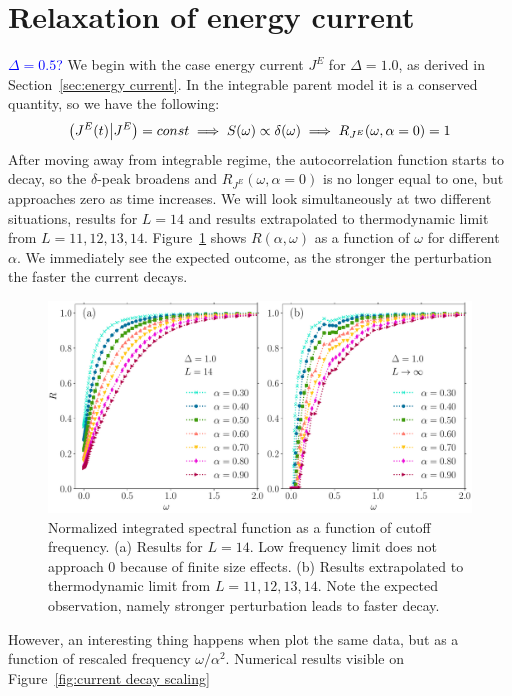 \section{Relaxation of energy current}
\textcolor{blue}{\(\Delta=0.5\)?}
We begin with the case energy current \(J^E\) for \(\Delta = 1.0\), as derived in Section~\ref{sec:energy current}.
In the integrable parent model it is a conserved quantity, so we have the following:
\begin{equation*}
  \left(J^E(t) \middle| J^E\right) = const \implies S(\omega) \propto \delta(\omega)
  \implies R_{J^E}(\omega,\alpha=0) = 1
\end{equation*}
After moving away from integrable regime, the autocorrelation function starts to decay,
so the \(\delta\)-peak broadens and \(R_{J^E}(\omega,\alpha=0)\) is no longer equal to one,
but approaches zero as time increases. We will look simultaneously at two different situations,
results for \(L=14\) and results extrapolated to thermodynamic limit from \(L=11,12,13,14\). 
Figure~\ref{fig:current decay no scaling} shows \(R(\alpha,\omega)\) as a
function of \(\omega\) for different \(\alpha\). We immediately see the expected outcome, as the stronger
the perturbation the faster the current decays.
\begin{figure}[htbp]
  \centering
  \includegraphics[width=\textwidth]{Figures/current_no_scaling.pdf}
  \caption{Normalized integrated spectral function as a function of cutoff frequency.
  (a) Results for \(L=14\). Low frequency limit does not approach 0
  because of finite size effects. (b) Results extrapolated to thermodynamic limit from \(L=11,12,13,14\).
  Note the expected observation, namely stronger perturbation leads to faster decay.}
  \label{fig:current decay no scaling}
\end{figure}
However, an interesting thing happens when plot the same data, but as a function of rescaled
frequency \(\omega/\alpha^2\). Numerical results visible on Figure~\ref{fig:current decay scaling}
